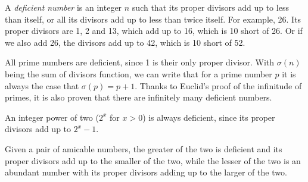 \documentclass[12pt]{article}
\begin{document}
A {\em deficient number} is an integer $n$ such that its proper divisors add up to less than itself, or all its divisors add up to less than twice itself. For example, 26. Its proper divisors are 1, 2 and 13, which add up to 16, which is 10 short of 26. Or if we also add 26, the divisors add up to 42, which is 10 short of 52.

All prime numbers are deficient, since 1 is their only proper divisor. With $\sigma(n)$ being the sum of divisors function, we can write that for a prime number $p$ it is always the case that $\sigma(p) = p + 1$. Thanks to Euclid's proof of the infinitude of primes, it is also proven that there are infinitely many deficient numbers.

An integer power of two ($2^x$ for $x > 0$) is always deficient, since its proper divisors add up to $2^x - 1$.

Given a pair of amicable numbers, the greater of the two is deficient and its proper divisors add up to the smaller of the two, while the lesser of the two is an abundant number with its proper divisors adding up to the larger of the two.
\end{document}

